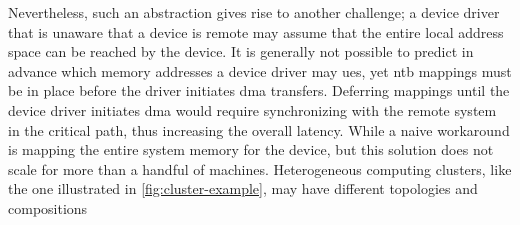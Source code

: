 Nevertheless, such an abstraction gives rise to another challenge; a device driver that is unaware that a device is remote may assume that the entire local address space can be reached by the device.
%
It is generally not possible to predict in advance which memory addresses a device driver may ues, yet \gls{ntb} mappings must be in place before the driver initiates \gls{dma} transfers.
%
Deferring mappings until the device driver initiates \gls{dma} would require synchronizing with the remote system in the critical path, thus increasing the overall latency.
%
While a naive workaround is mapping the entire system memory for the device, but this solution does not scale for more than a handful of machines.
%
Heterogeneous computing clusters, like the one illustrated in \cref{fig:cluster-example}, may have different topologies and compositions






%
%


